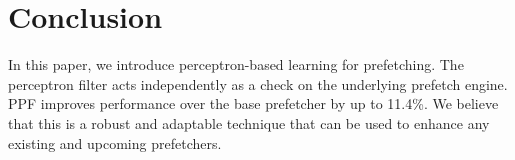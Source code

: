 \section{Conclusion}
\label{Conclusion}
In this paper, we introduce perceptron-based learning for prefetching. The
perceptron filter acts independently as a check on the underlying prefetch
engine. PPF improves performance over the base prefetcher by up to 11.4\%. 
We believe that this is a robust and adaptable technique that can be used 
to enhance any existing and upcoming prefetchers.
